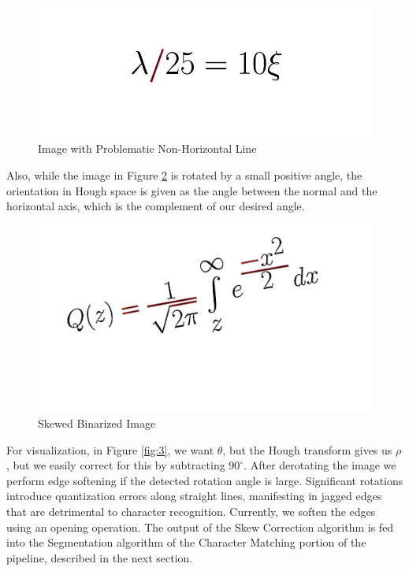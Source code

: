 \documentclass[journal]{IEEEtran}
\begin{document}
 \begin{figure}[!t]
    \centering
    \includegraphics[width=\columnwidth]{fig1}
    \caption{Image with Problematic Non-Horizontal Line}
    \label{fig:1}
 \end{figure}
 
 Also, while the image in Figure \ref{fig:2} is rotated by a small positive angle, the orientation in Hough space is given as the angle between the normal and the horizontal axis, which is the complement of our desired angle. 
 
\begin{figure}[!t]
  \centering
  \includegraphics[width=\columnwidth]{fig2}
  \caption{Skewed Binarized Image}
  \label{fig:2}
\end{figure}
 
 For visualization, in Figure \ref{fig:3}, we want $\theta$, but the Hough transform gives us $\rho$, but we easily correct for this by subtracting $90^\circ$. After derotating the image we perform edge softening if the detected rotation angle is large. Significant rotations introduce quantization errors along straight lines, manifesting in jagged edges that are detrimental to character recognition. Currently, we soften the edges using an opening operation. The output of the Skew Correction algorithm is fed into the Segmentation algorithm of the Character Matching portion of the pipeline, described in the next section.
 
\end{document}
